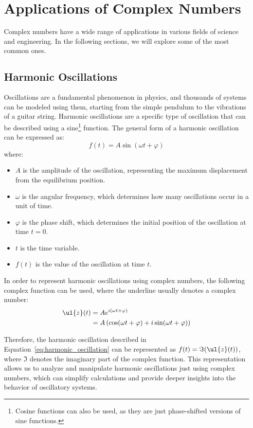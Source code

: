 \chapter{Applications of Complex Numbers}

Complex numbers have a wide range of applications in various fields of science and engineering. In the following sections, we will explore some of the most common ones.

\section{Harmonic Oscillations}

Oscillations are a fundamental phenomenon in physics, and thousands of systems can be modeled using them, starting from the simple pendulum to the vibrations of a guitar string. Harmonic oscillations are a specific type of oscillation that can be described using a sine\footnote{Cosine functions can also be used, as they are just phase-shifted versions of sine functions.} function. The general form of a harmonic oscillation can be expressed as:
\begin{equation}
f(t) = A \sin(\omega t + \varphi)
\label{eq:harmonic_oscillation}
\end{equation}
where:
\begin{itemize}
    \item $A$ is the amplitude of the oscillation, representing the maximum displacement from the equilibrium position.
    \item $\omega$ is the angular frequency, which determines how many oscillations occur in a unit of time.
    \item $\varphi$ is the phase shift, which determines the initial position of the oscillation at time $t=0$.
    \item $t$ is the time variable.
    \item $f(t)$ is the value of the oscillation at time $t$.
\end{itemize}

In order to represent harmonic oscillations using complex numbers, the following complex function can be used, where the underline usually denotes a complex number:
\begin{align*}
\ul{z}(t) &= A e^{i(\omega t + \varphi)}
\\&= A \left( \cos(\omega t + \varphi) + i \sin(\omega t + \varphi) \right)
\end{align*}

Therefore, the harmonic oscillation described in Equation~\ref{eq:harmonic_oscillation} can be represented as $f(t)=\Im(\ul{z}(t))$, where $\Im$ denotes the imaginary part of the complex function. This representation allows us to analyze and manipulate harmonic oscillations just using complex numbers, which can simplify calculations and provide deeper insights into the behavior of oscillatory systems.


